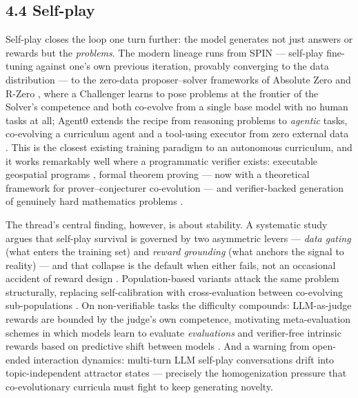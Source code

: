 \documentclass[
  11pt,
]{article}
\begin{document}
\subsection{4.4 Self-play}\label{self-play}

Self-play closes the loop one turn further: the model generates not just
answers or rewards but the \emph{problems}. The modern lineage runs from
SPIN --- self-play fine-tuning against one's own previous iteration,
provably converging to the data distribution \citep{chen2024spin} --- to
the zero-data proposer--solver frameworks of Absolute Zero
\citep{zhao2025absolutezero} and R-Zero \citep{huang2025rzero}, where a
Challenger learns to pose problems at the frontier of the Solver's
competence and both co-evolve from a single base model with no human
tasks at all; Agent0 extends the recipe from reasoning problems to
\emph{agentic} tasks, co-evolving a curriculum agent and a tool-using
executor from zero external data \citep{xia2025agent0}. This is the
closest existing training paradigm to an autonomous curriculum, and it
works remarkably well where a programmatic verifier exists: executable
geospatial programs \citep{ahn2026geox}, formal theorem proving --- now
with a theoretical framework for prover--conjecturer co-evolution
\citep{chen2026theoretical} --- and verifier-backed generation of
genuinely hard mathematics problems \citep{lai2026verifier}.

The thread's central finding, however, is about stability. A systematic
study argues that self-play survival is governed by two asymmetric
levers --- \emph{data gating} (what enters the training set) and
\emph{reward grounding} (what anchors the signal to reality) --- and
that collapse is the default when either fails, not an occasional
accident of reward design \citep{pu2026survive}. Population-based
variants attack the same problem structurally, replacing
self-calibration with cross-evaluation between co-evolving
sub-populations \citep{castanyer2026populora}. On non-verifiable tasks
the difficulty compounds: LLM-as-judge rewards are bounded by the
judge's own competence, motivating meta-evaluation schemes in which
models learn to evaluate \emph{evaluations} \citep{sui2026conversation}
and verifier-free intrinsic rewards based on predictive shift between
models \citep{huang2026g}. And a warning from open-ended interaction
dynamics: multi-turn LLM self-play conversations drift into
topic-independent attractor states \citep{ko2026attractor} --- precisely
the homogenization pressure that co-evolutionary curricula must fight to
keep generating novelty.
\end{document}
